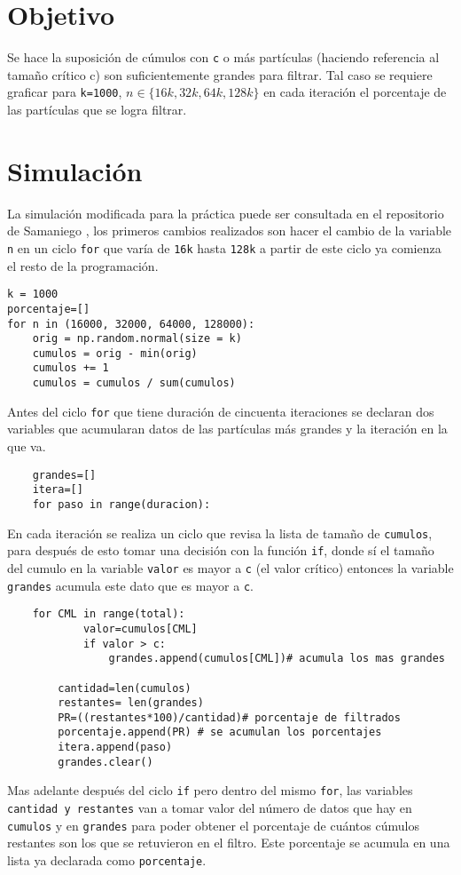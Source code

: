 \documentclass[a4paper, 11pt]{article}
\begin{document}
\section{Objetivo}
Se hace la suposición de cúmulos con \texttt{c} o más partículas (haciendo referencia al tamaño crítico c) son suficientemente grandes para filtrar.
Tal caso se requiere graficar para \texttt{k=1000}, \texttt{$n\in \{ 16k, 32k, 64k, 128k\}$} en cada iteración  el porcentaje de las partículas que se logra filtrar.

\section{Simulación}
La simulación modificada para la práctica puede ser consultada en el repositorio de Samaniego \cite{Edson}, los primeros cambios realizados son hacer el cambio de la variable \texttt{n} en un ciclo \texttt{for} que varía de \texttt{16k} hasta \texttt{128k} a partir de este ciclo ya comienza el resto de la programación.
\begin{verbatim}
k = 1000
porcentaje=[]
for n in (16000, 32000, 64000, 128000):
    orig = np.random.normal(size = k)
    cumulos = orig - min(orig)
    cumulos += 1 
    cumulos = cumulos / sum(cumulos) 
\end{verbatim}

Antes del ciclo \texttt{for} que tiene duración de cincuenta iteraciones se declaran dos variables que acumularan datos de las partículas más grandes y la iteración en la que va.
\begin{verbatim}
    grandes=[]
    itera=[]
    for paso in range(duracion):
\end{verbatim}
En cada iteración se realiza un ciclo que revisa la lista de tamaño de \texttt{cumulos}, para después de esto tomar una decisión con la función \texttt{if}, donde sí el tamaño del cumulo en la variable \texttt{valor} es mayor a \texttt{c} (el valor crítico) entonces la variable \texttt{grandes} acumula este dato que es mayor a \texttt{c}.
\begin{verbatim}
    for CML in range(total):
            valor=cumulos[CML]
            if valor > c:
                grandes.append(cumulos[CML])# acumula los mas grandes
    
        cantidad=len(cumulos)    
        restantes= len(grandes)
        PR=((restantes*100)/cantidad)# porcentaje de filtrados
        porcentaje.append(PR) # se acumulan los porcentajes
        itera.append(paso)
        grandes.clear()
\end{verbatim}
Mas adelante después del ciclo \texttt{if} pero dentro del mismo \texttt{for}, las variables \texttt{cantidad y restantes} van a tomar valor del número de datos que hay en \texttt{cumulos} y en \texttt{grandes} para poder obtener el porcentaje de cuántos cúmulos restantes son los que se retuvieron en el filtro. 
Este porcentaje se acumula en una lista ya declarada como \texttt{porcentaje}.
\end{document}
